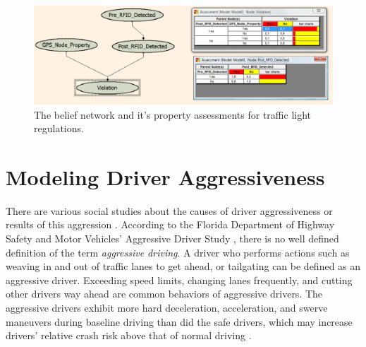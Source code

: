 \documentclass[a4paper,oneside,12pt]{report}
\begin{document}
\begin{figure}[ht]
\begin{center}
\includegraphics[width=140mm]{img/redlight_bn.eps}
\caption{The belief network and it's property assessments for traffic light regulations.}
\label{fig:bnredlight}
\end{center}
\end{figure}


\section{Modeling Driver Aggressiveness}

There are various social studies about the causes of driver aggressiveness \cite{lajunen_does_1999} or results of this aggression \cite{shinar_aggressive_1998}. According to the Florida Department of Highway Safety and Motor Vehicles' Aggressive Driver Study \cite{florida_aggresive_1999}, there is no well defined definition of the term \textit{aggressive driving}. A driver who performs actions such as weaving in and out of traffic lanes to get ahead, or tailgating can be defined as an aggressive driver. Exceeding speed limits, changing lanes frequently, and cutting other drivers way ahead are common behaviors of aggressive drivers. The aggressive drivers exhibit more hard deceleration, acceleration, and swerve maneuvers during baseline driving than did the safe drivers, which may increase drivers' relative crash risk above that of normal driving \cite{klauer_comparing_2008}.
\end{document}
